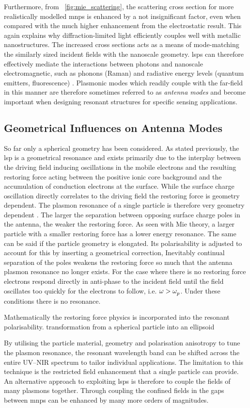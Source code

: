 \documentclass{article}
\begin{document}
Furthermore, from \figurename~\ref{fig:mie_scattering}, the scattering cross section for more realistically modelled \glspl{mnp} is enhanced by a not insignificant factor, even when compared with the much higher enhancement from the electrostatic result. This again explains why diffraction-limited light efficiently couples well with metallic nanostructures. The increased cross sections acts as a means of mode-matching the similarly sized incident fields with the nanoscale geometry. \glspl{lsp} can therefore effectively mediate the interactions between photons and nanoscale electromagnetic, such as phonons (Raman) and radiative energy levels (quantum emitters, fluorescence) \cite{berweger2012}. Plasmonic modes which readily couple with the far-field in this manner are therefore sometimes referred to as \emph{antenna modes} and become important when designing resonant structures for specific sensing applications.

\subsection{Geometrical Influences on Antenna Modes}

So far only a spherical geometry has been considered. As stated previously, the \gls{lsp} is a geometrical resonance and exists primarily due to the interplay between the driving field inducing oscillations in the mobile electrons and the resulting restoring force acting between the positive ionic core background and the accumulation of conduction electrons at the surface. While the surface charge oscillation directly correlates to the driving field the restoring force is geometry dependent. The plasmon resonance of a single particle is therefore very geometry dependent \cite{krenn2002, mock2002, kuwata2003}.
The larger the separation between opposing surface charge poles in the antenna, the weaker the restoring force. As seen with Mie theory, a larger particle with a smaller restoring force has a lower energy resonance. The same can be said if the particle geometry is elongated. Its polarisability is adjusted to account for this by inserting a geometrical correction,
Inevitably continual separation of the poles weakens the restoring force so much that the antenna plasmon resonance no longer exists.
For the case where there is no restoring force electrons respond directly in anti-phase to the incident field until the field oscillates too quickly for the electrons to follow, i.e. $\omega>\omega_{p}^{}$. Under these conditions there is no resonance.

Mathematically the restoring force physics is incorporated into the resonant polarisability. transformation from a spherical particle into an ellipsoid

By utilising the particle material, geometry and polarisation anisotropy to tune the plasmon resonance, the resonant wavelength band can be shifted across the entire UV--NIR spectrum to tailor individual applications. The limitation to this technique is the restricted field enhancement that a single particle can provide.
An alternative approach to exploiting \glspl{lsp} is therefore to couple the fields of many plasmons together. Through coupling the confined fields in the gaps between \glspl{mnp} can be enhanced by many more orders of magnitudes.
\end{document}
